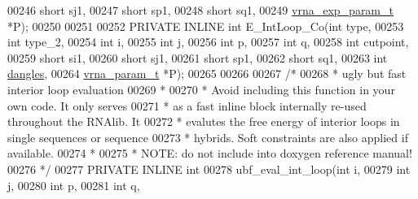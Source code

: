 \begin{DoxyCode}
00246                                         \textcolor{keywordtype}{short}             sj1,
00247                                         \textcolor{keywordtype}{short}             sp1,
00248                                         \textcolor{keywordtype}{short}             sq1,
00249                                         \hyperlink{group__energy__parameters_structvrna__exp__param__s}{vrna\_exp\_param\_t}  *P);
00250 
00251 
00252 PRIVATE INLINE \textcolor{keywordtype}{int} E\_IntLoop\_Co(\textcolor{keywordtype}{int}           type,
00253                                 \textcolor{keywordtype}{int}           type\_2,
00254                                 \textcolor{keywordtype}{int}           i,
00255                                 \textcolor{keywordtype}{int}           j,
00256                                 \textcolor{keywordtype}{int}           p,
00257                                 \textcolor{keywordtype}{int}           q,
00258                                 \textcolor{keywordtype}{int}           cutpoint,
00259                                 \textcolor{keywordtype}{short}         si1,
00260                                 \textcolor{keywordtype}{short}         sj1,
00261                                 \textcolor{keywordtype}{short}         sp1,
00262                                 \textcolor{keywordtype}{short}         sq1,
00263                                 \textcolor{keywordtype}{int}           \hyperlink{group__model__details_ga72b511ed1201f7e23ec437e468790d74}{dangles},
00264                                 \hyperlink{group__energy__parameters_structvrna__param__s}{vrna\_param\_t}  *P);
00265 
00266 
00267 \textcolor{comment}{/*}
00268 \textcolor{comment}{ *  ugly but fast interior loop evaluation}
00269 \textcolor{comment}{ *}
00270 \textcolor{comment}{ *  Avoid including this function in your own code. It only serves}
00271 \textcolor{comment}{ *  as a fast inline block internally re-used throughout the RNAlib. It}
00272 \textcolor{comment}{ *  evalutes the free energy of interior loops in single sequences or sequence}
00273 \textcolor{comment}{ *  hybrids. Soft constraints are also applied if available.}
00274 \textcolor{comment}{ *}
00275 \textcolor{comment}{ *  NOTE: do not include into doxygen reference manual!}
00276 \textcolor{comment}{ */}
00277 PRIVATE INLINE \textcolor{keywordtype}{int}
00278 ubf\_eval\_int\_loop(\textcolor{keywordtype}{int}           i,
00279                   \textcolor{keywordtype}{int}           j,
00280                   \textcolor{keywordtype}{int}           p,
00281                   \textcolor{keywordtype}{int}           q,

\end{DoxyCode}
